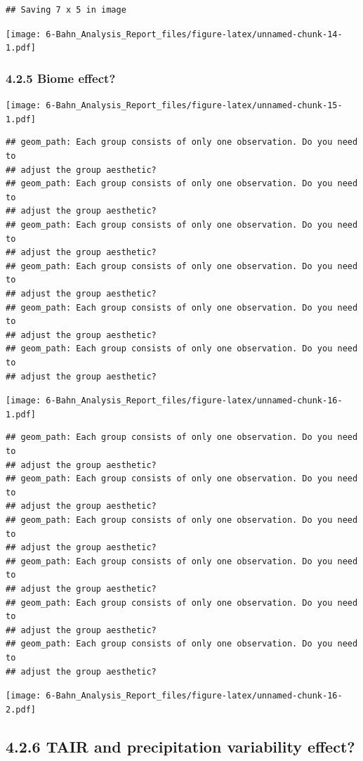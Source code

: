 \documentclass[]{article}
\begin{document}
\begin{verbatim}
## Saving 7 x 5 in image
\end{verbatim}

\texttt{[image: 6-Bahn\_Analysis\_Report\_files/figure-latex/unnamed-chunk-14-1.pdf]}

\hypertarget{biome-effect}{%
\subsubsection{4.2.5 Biome effect?}\label{biome-effect}}

\texttt{[image: 6-Bahn\_Analysis\_Report\_files/figure-latex/unnamed-chunk-15-1.pdf]}

\begin{verbatim}
## geom_path: Each group consists of only one observation. Do you need to
## adjust the group aesthetic?
## geom_path: Each group consists of only one observation. Do you need to
## adjust the group aesthetic?
## geom_path: Each group consists of only one observation. Do you need to
## adjust the group aesthetic?
## geom_path: Each group consists of only one observation. Do you need to
## adjust the group aesthetic?
## geom_path: Each group consists of only one observation. Do you need to
## adjust the group aesthetic?
## geom_path: Each group consists of only one observation. Do you need to
## adjust the group aesthetic?
\end{verbatim}

\texttt{[image: 6-Bahn\_Analysis\_Report\_files/figure-latex/unnamed-chunk-16-1.pdf]}

\begin{verbatim}
## geom_path: Each group consists of only one observation. Do you need to
## adjust the group aesthetic?
## geom_path: Each group consists of only one observation. Do you need to
## adjust the group aesthetic?
## geom_path: Each group consists of only one observation. Do you need to
## adjust the group aesthetic?
## geom_path: Each group consists of only one observation. Do you need to
## adjust the group aesthetic?
## geom_path: Each group consists of only one observation. Do you need to
## adjust the group aesthetic?
## geom_path: Each group consists of only one observation. Do you need to
## adjust the group aesthetic?
\end{verbatim}

\texttt{[image: 6-Bahn\_Analysis\_Report\_files/figure-latex/unnamed-chunk-16-2.pdf]}

\hypertarget{tair-and-precipitation-variability-effect}{%
\subsection{4.2.6 TAIR and precipitation variability
effect?}\label{tair-and-precipitation-variability-effect}}
\end{document}
